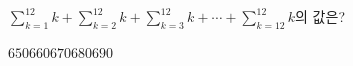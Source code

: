 \hspace*{2mm}\begin{minipage}[t]{\dimexpr\linewidth-2mm\relax}\vspace{0pt}
$\displaystyle\sum_{k=1}^{12}k+\sum_{k=2}^{12}k+\sum_{k=3}^{12}k+\cdots+\sum_{k=12}^{12}k$의 값은?
\begin{choices32}{$650$}{$660$}{$670$}{$680$}{$690$}\end{choices32}\end{minipage}
